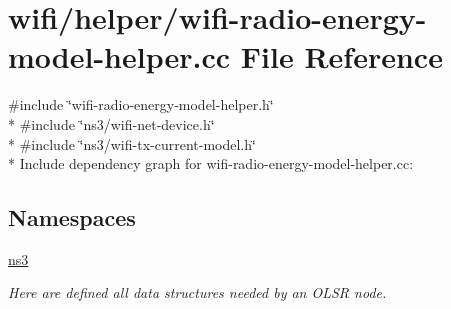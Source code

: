 \hypertarget{wifi-radio-energy-model-helper_8cc}{}\section{wifi/helper/wifi-\/radio-\/energy-\/model-\/helper.cc File Reference}
\label{wifi-radio-energy-model-helper_8cc}
{\ttfamily \#include \char`\"{}wifi-\/radio-\/energy-\/model-\/helper.\+h\char`\"{}}\\*
{\ttfamily \#include \char`\"{}ns3/wifi-\/net-\/device.\+h\char`\"{}}\\*
{\ttfamily \#include \char`\"{}ns3/wifi-\/tx-\/current-\/model.\+h\char`\"{}}\\*
Include dependency graph for wifi-\/radio-\/energy-\/model-\/helper.cc\+:
\subsection*{Namespaces}
\begin{DoxyCompactItemize}
\item 
 \hyperlink{namespacens3}{ns3}
\begin{DoxyCompactList}\small\item\em Here are defined all data structures needed by an O\+L\+SR node. \end{DoxyCompactList}\end{DoxyCompactItemize}
